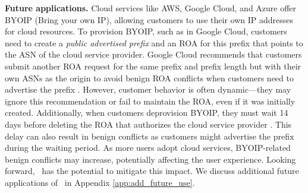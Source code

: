 \noindent\textbf{Future applications.}
Cloud services like AWS, Google Cloud, and Azure offer BYOIP (Bring your own IP), allowing customers to use their own IP addresses for cloud resources. To provision BYOIP, such as in Google Cloud, customers need to create a \textit{public advertised prefix} and an ROA for this prefix that points to the ASN of the cloud service provider.
Google Cloud recommends that customers submit another ROA request for the same prefix and prefix length but with their own ASNs as the origin to avoid benign ROA conflicts when customers need to advertise the prefix \cite{googlecloud}. However, customer behavior is often dynamic—they may ignore this recommendation or fail to maintain the ROA, even if it was initially created. Additionally, when customers deprovision BYOIP, they must wait 14 days before deleting the ROA that authorizes the cloud service provider \cite{googlecloud}.
This delay can also result in benign conflicts as customers might advertise the prefix during the waiting period.
As more users adopt cloud services, BYOIP-related benign conflicts may increase, potentially affecting the user experience. Looking forward, \lov\ has the potential to mitigate this impact. We discuss additional future applications of \lov\ in Appendix \ref{app:add_future_use}.





